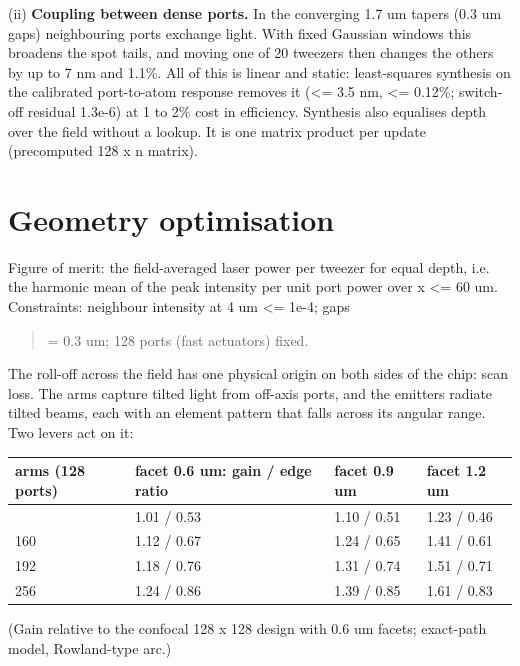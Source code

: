 (ii) \textbf{Coupling between dense ports.} In the converging 1.7 um
tapers (0.3 um gaps) neighbouring ports exchange light. With fixed
Gaussian windows this broadens the spot tails, and moving one of 20
tweezers then changes the others by up to 7 nm and 1.1\%. All of this is
linear and static: least-squares synthesis on the calibrated
port-to-atom response removes it (\textless= 3.5 nm, \textless= 0.12\%;
switch-off residual 1.3e-6) at 1 to 2\% cost in efficiency. Synthesis
also equalises depth over the field without a lookup. It is one matrix
product per update (precomputed 128 x n matrix).

\hypertarget{4-geometry-optimisation}{%
\section{Geometry optimisation}\label{fpr_design-4-geometry-optimisation}}

Figure of merit: the field-averaged laser power per tweezer for equal
depth, i.e. the harmonic mean of the peak intensity per unit port power
over \textbar x\textbar{} \textless= 60 um. Constraints: neighbour
intensity at 4 um \textless= 1e-4; gaps

\begin{quote}
= 0.3 um; 128 ports (fast actuators) fixed.
\end{quote}

The roll-off across the field has one physical origin on both sides of
the chip: scan loss. The arms capture tilted light from off-axis ports,
and the emitters radiate tilted beams, each with an element pattern that
falls across its angular range. Two levers act on it:

{\small
\begin{longtable}[]{@{}llll@{}}
\toprule\noalign{}
arms (128 ports) & facet 0.6 um: gain / edge ratio & facet 0.9 um &
facet 1.2 um \\
\midrule\noalign{}
\endhead
\bottomrule\noalign{}
\endlastfoot
128 & 1.01 / 0.53 & 1.10 / 0.51 & 1.23 / 0.46 \\
160 & 1.12 / 0.67 & 1.24 / 0.65 & 1.41 / 0.61 \\
192 & 1.18 / 0.76 & 1.31 / 0.74 & 1.51 / 0.71 \\
256 & 1.24 / 0.86 & 1.39 / 0.85 & 1.61 / 0.83 \\
\end{longtable}
}

(Gain relative to the confocal 128 x 128 design with 0.6 um facets;
exact-path model, Rowland-type arc.)

